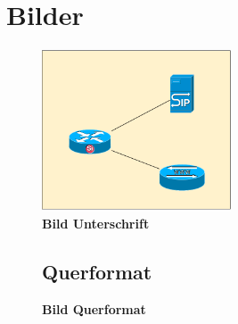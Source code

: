 \documentclass[a4,12pt]{scrartcl}
\begin{document}
\section{Bilder}
\begin{figure} [H]
	\begin{center}
	\includegraphics[width=0.50\textwidth]{./pictures/sample_picture.pdf}
	\caption{\textbf{Bild Unterschrift}}
	\label{Bild Referenz}
	\end{center}
\end{figure}

\begin{landscape}
\begin{figure}[htbp]
\subsection{Querformat}
\centering
{}
\caption{\textbf{Bild Querformat}}
\end{figure}
\end{landscape}	
\end{document}
